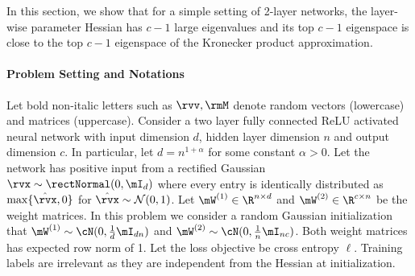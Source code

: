 
In this section, %
we show that for a simple setting of 2-layer networks, %
the layer-wise parameter Hessian has $c-1$ large eigenvalues and its top $c-1$ eigenspace is close to the top $c-1$ eigenspace of the Kronecker product approximation.

\paragraph{Problem Setting and Notations}
\label{sec:theory:setting}
Let bold non-italic letters such as $\rvv, \rmM$ denote random vectors (lowercase) and matrices (uppercase).
Consider a two layer fully connected ReLU activated neural network with input dimension $d$, hidden layer dimension $n$ and output dimension $c$. In particular, let $d=n^{1+\alpha}$ for some constant $\alpha>0$. Let the network has positive input from a rectified Gaussian $\rvx\sim \rectNormal(0, \mI_d)$ where every entry is identically distributed as $\max\{\hat{\rvx},0\}$ for $\hat{\rvx}\sim \mathcal{N}(0,1)$. %
Let $\mW^{(1)}\in\R^{n\times d}$ and $\mW^{(2)}\in\R^{c\times n}$ be the weight matrices. In this problem we consider a random Gaussian initialization that $\mW^{(1)}\sim \cN(0,\frac1d\mI_{dn})$ and $\mW^{(2)}\sim \cN(0,\frac1n\mI_{nc})$. Both weight matrices has expected row norm of 1. Let the loss objective be cross entropy $\ell$. Training labels are irrelevant as they are independent from the Hessian at initialization. %

